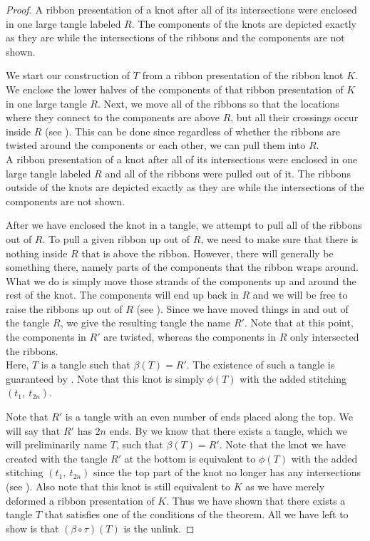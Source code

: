 \begin{paper}
\begin{proof}
{A ribbon presentation of a knot after all of its intersections were enclosed in
one large tangle labeled $R$.
The components of the knots are depicted exactly as they are while the
intersections of the ribbons and the components are not shown.}

We start our construction of $T$ from a ribbon presentation of the ribbon knot
$K$.
We enclose the lower halves of the components of that ribbon presentation of $K$
in one large tangle $R$.
Next, we move all of the ribbons so that the locations where they connect to the
components are above $R$, but all their crossings occur inside $R$
(see \figLowered).
This can be done since regardless of whether the ribbons are twisted around the
components or each other, we can pull them into $R$.\\

{A ribbon presentation of a knot after all of its intersections were enclosed in
one large tangle labeled $R$ and all of the ribbons were pulled out of it.
The ribbons outside of the knots are depicted exactly as they are while the
intersections of the components are not shown.}

After we have enclosed the knot in a tangle, we attempt to pull all of the
ribbons out of $R$.
To pull a given ribbon up out of $R$, we need to make sure that there is nothing
inside $R$ that is above the ribbon.
However, there will generally be something there, namely parts of the components
that the ribbon wraps around.
What we do is simply move those strands of the components up and around the rest
of the knot.
The components will end up back in $R$ and we will be free to raise the ribbons
up out of $R$ (see \figTwisted).
Since we have moved things in and out of the tangle $R$, we give the resulting
tangle the name $R'$.
Note that at this point, the components in $R'$ are twisted, whereas the
components in $R$ only intersected the ribbons.\\

{Here, $T$ is a tangle such that $\beta(T)=R'$.
The existence of such a tangle is guaranteed by \lemTangles.
Note that this knot is simply $\phi(T)$ with the added stitching
$(t_1,~t_{2n})$.}

Note that $R'$ is a tangle with an even number of ends placed along the top.
We will say that $R'$ has $2n$ ends.
By \lemTangles we know that there exists a tangle, which we will preliminarily
name $T$, such that $\beta(T)=R'$.
Note that the knot we have created with the tangle $R'$ at the bottom is
equivalent to $\phi(T)$ with the added stitching $(t_1,~t_{2n})$ since the top
part of the knot no longer has any intersections (see \figFinal).
Also note that this knot is still equivalent to $K$ as we have merely deformed
a ribbon presentation of $K$.
Thus we have shown that there exists a tangle $T$ that satisfies one of the
conditions of the theorem.
All we have left to show is that $(\beta\circ\tau)(T)$ is the unlink.


\end{proof}
\end{paper}
